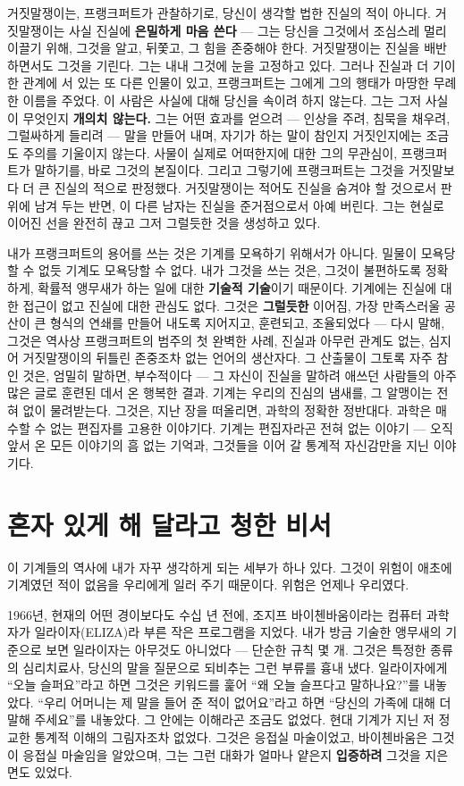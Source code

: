 거짓말쟁이는, 프랭크퍼트가 관찰하기로, 당신이 생각할 법한 진실의 적이 아니다. 거짓말쟁이는 사실 진실에 \textbf{은밀하게 마음 쓴다} — 그는 당신을 그것에서 조심스레 멀리 이끌기 위해, 그것을 알고, 뒤쫓고, 그 힘을 존중해야 한다. 거짓말쟁이는 진실을 배반하면서도 그것을 기린다. 그는 내내 그것에 눈을 고정하고 있다. 그러나 진실과 더 기이한 관계에 서 있는 또 다른 인물이 있고, 프랭크퍼트는 그에게 그의 행태가 마땅한 무례한 이름을 주었다. 이 사람은 사실에 대해 당신을 속이려 하지 않는다. 그는 그저 사실이 무엇인지 \textbf{개의치 않는다.} 그는 어떤 효과를 얻으려 — 인상을 주려, 침묵을 채우려, 그럴싸하게 들리려 — 말을 만들어 내며, 자기가 하는 말이 참인지 거짓인지에는 조금도 주의를 기울이지 않는다. 사물이 실제로 어떠한지에 대한 그의 무관심이, 프랭크퍼트가 말하기를, 바로 그것의 본질이다. 그리고 그렇기에 프랭크퍼트는 그것을 거짓말보다 더 큰 진실의 적으로 판정했다. 거짓말쟁이는 적어도 진실을 숨겨야 할 것으로서 판 위에 남겨 두는 반면, 이 다른 남자는 진실을 준거점으로서 아예 버린다. 그는 현실로 이어진 선을 완전히 끊고 그저 그럴듯한 것을 생성하고 있다.

내가 프랭크퍼트의 용어를 쓰는 것은 기계를 모욕하기 위해서가 아니다. 밀물이 모욕당할 수 없듯 기계도 모욕당할 수 없다. 내가 그것을 쓰는 것은, 그것이 불편하도록 정확하게, 확률적 앵무새가 하는 일에 대한 \textbf{기술적 기술}이기 때문이다. 기계에는 진실에 대한 접근이 없고 진실에 대한 관심도 없다. 그것은 \textbf{그럴듯한} 이어짐, 가장 만족스러울 공산이 큰 형식의 연쇄를 만들어 내도록 지어지고, 훈련되고, 조율되었다 — 다시 말해, 그것은 역사상 프랭크퍼트의 범주의 첫 완벽한 사례, 진실과 아무런 관계도 없는, 심지어 거짓말쟁이의 뒤틀린 존중조차 없는 언어의 생산자다. 그 산출물이 그토록 자주 참인 것은, 엄밀히 말하면, 부수적이다 — 그 자신이 진실을 말하려 애쓰던 사람들의 아주 많은 글로 훈련된 데서 온 행복한 결과. 기계는 우리의 진심의 냄새를, 그 알맹이는 전혀 없이 물려받는다. 그것은, 지난 장을 떠올리면, 과학의 정확한 정반대다. 과학은 매수할 수 없는 편집자를 고용한 이야기다. 기계는 편집자라곤 전혀 없는 이야기 — 오직 앞서 온 모든 이야기의 흠 없는 기억과, 그것들을 이어 갈 통계적 자신감만을 지닌 이야기다.

\section*{혼자 있게 해 달라고 청한 비서}

이 기계들의 역사에 내가 자꾸 생각하게 되는 세부가 하나 있다. 그것이 위험이 애초에 기계였던 적이 없음을 우리에게 일러 주기 때문이다. 위험은 언제나 우리였다.

1966년, 현재의 어떤 경이보다도 수십 년 전에, 조지프 바이첸바움이라는 컴퓨터 과학자가 일라이자(ELIZA)라 부른 작은 프로그램을 지었다. 내가 방금 기술한 앵무새의 기준으로 보면 일라이자는 아무것도 아니었다 — 단순한 규칙 몇 개. 그것은 특정한 종류의 심리치료사, 당신의 말을 질문으로 되비추는 그런 부류를 흉내 냈다. 일라이자에게 ``오늘 슬퍼요''라고 하면 그것은 키워드를 훑어 ``왜 오늘 슬프다고 말하나요?''를 내놓았다. ``우리 어머니는 제 말을 들어 준 적이 없어요''라고 하면 ``당신의 가족에 대해 더 말해 주세요''를 내놓았다. 그 안에는 이해라곤 조금도 없었다. 현대 기계가 지닌 저 정교한 통계적 이해의 그림자조차 없었다. 그것은 응접실 마술이었고, 바이첸바움은 그것이 응접실 마술임을 알았으며, 그는 그런 대화가 얼마나 얕은지 \textbf{입증하려} 그것을 지은 면도 있었다.

